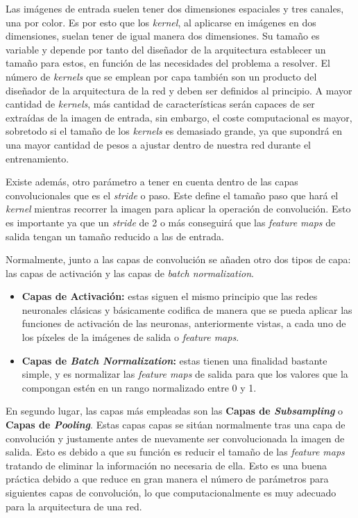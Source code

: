 Las imágenes de entrada suelen tener dos dimensiones espaciales y tres canales, una por color. Es por esto que los \textit{kernel}, al aplicarse en imágenes en dos dimensiones, suelan tener de igual manera dos dimensiones. Su tamaño es variable y depende por tanto del diseñador de la arquitectura establecer un tamaño para estos, en función de las necesidades del problema a resolver. El número de \textit{kernels} que se emplean por capa también son un producto del diseñador de la arquitectura de la red y deben ser definidos al principio. A mayor cantidad de \textit{kernels}, más cantidad de características serán capaces de ser extraídas de la imagen de entrada, sin embargo, el coste computacional es mayor, sobretodo si el tamaño de los \textit{kernels} es demasiado grande, ya que supondrá en una mayor cantidad de pesos a ajustar dentro de nuestra red durante el entrenamiento.

Existe además, otro parámetro a tener en cuenta dentro de las capas convolucionales que es el \textit{stride} o paso. Este define el tamaño paso que hará el \textit{kernel} mientras recorrer la imagen para aplicar la operación de convolución. Esto es importante ya que un \textit{stride} de 2 o más conseguirá que las \textit{feature maps} de salida tengan un tamaño reducido a las de entrada.

Normalmente, junto a las capas de convolución se añaden otro dos tipos de capa: las capas de activación y las capas de \textit{batch normalization}.

\begin{itemize}
    \item \textbf{Capas de Activación:} estas siguen el mismo principio que las redes neuronales clásicas y básicamente codifica de manera que se pueda aplicar las funciones de activación de las neuronas, anteriormente vistas, a cada uno de los píxeles de la imágenes de salida o \textit{feature maps}.
    
    \item \textbf{Capas de \textit{Batch Normalization}:} estas tienen una finalidad bastante simple, y es normalizar las \textit{feature maps} de salida para que los valores que la compongan estén en un rango normalizado entre 0 y 1. 
\end{itemize}

En segundo lugar, las capas más empleadas son las \textbf{Capas de \textit{Subsampling}} o \textbf{Capas de \textit{Pooling}}. Estas capas capas se sitúan normalmente tras una capa de convolución y justamente antes de nuevamente ser convolucionada la imagen de salida. Esto es debido a que su función es reducir el tamaño de las \textit{feature maps} tratando de eliminar la información no necesaria de ella. Esto es una buena práctica debido a que reduce en gran manera el número de parámetros para siguientes capas de convolución, lo que computacionalmente es muy adecuado para la arquitectura de una red. 


